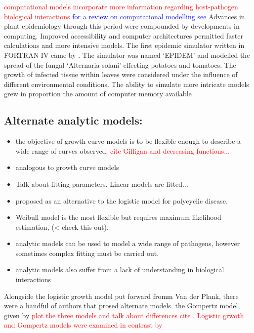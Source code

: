     \textcolor{red}{computational models incorporate more information regarding host-pathogen biological interactions} \textcolor{blue}{for a review on computational modelling see \cite{doi:10.1146/annurev.py.23.090185.002031}} Advances in plant epidemiology through this period were compounded by developments in computing. Improved accessibility and computer architectures permitted faster calculations and more intensive models. The first epidemic simulator written in FORTRAN IV came by \cite{waggoner1969epidem}. The simulator was named `EPIDEM' and modelled the spread of the fungal `Alternaria solani' effecting potatoes and tomatoes. The growth of infected tissue within leaves were considered under the influence of different environmental conditions. The ability to simulate more intricate models grew in proportion the amount of computer memory available \cite{zadoks1972methodology}.
    
    \subsection{Alternate analytic models:}
    \begin{itemize}
        \item the objective of growth curve models is to be flexible enough to describe a wide range of curves observed. \textcolor{red}{cite Gilligan and decreasing functions...}
        \item analogous to growth curve models 
        \item Talk about fitting parameters. Linear models are fitted... 
        \item proposed as an alternative to the logistic model for polycyclic disease. \cite{doi:10.1146/annurev.py.21.090183.000401}
        \item Weibull model is the most flexible but requires maximum likelihood estimation, (<-check this out), 
        \item analytic models can be used to model a wide range of pathogens, however sometimes complex fitting must be carried out.
        \item analytic models also suffer from a lack of understanding in biological interactions
    \end{itemize}
    
    Alongside the logistic growth model put forward fromm Van der Plank, there were a handful of authors that prosed alternate models. the Gompertz model, given by 
    \textcolor{red}{plot the three models and talk about differences cite \cite{madden1980quantification}. Logistic grwoth and Gompertz models were examined in contrast by \cite{berger1981comparison}}
    
